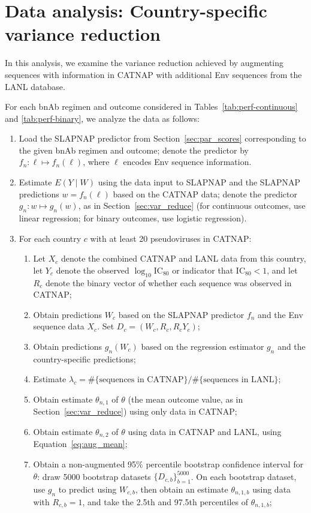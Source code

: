 \documentclass[10pt]{article}
\begin{document}
\section{Data analysis: Country-specific variance reduction}

In this analysis, we examine the variance reduction achieved by augmenting sequences with information in CATNAP with additional Env sequences from the LANL database.

For each bnAb regimen and outcome considered in Tables~\ref{tab:perf-continuous} and \ref{tab:perf-binary}, we analyze the data as follows:
\begin{enumerate}
  \item Load the SLAPNAP predictor from Section~\ref{sec:par_scores} corresponding to the given bnAb regimen and outcome; denote the predictor by $f_n: \ell \mapsto f_n(\ell)$, where $\ell$ encodes Env sequence information.
  \item Estimate $E(Y \mid W)$ using the data input to SLAPNAP and the SLAPNAP predictions $w = f_n(\ell)$ based on the CATNAP data; denote the predictor $g_n: w \mapsto g_n(w)$, as in Section~\ref{sec:var_reduce} (for continuous outcomes, use linear regression; for binary outcomes, use logistic regression).
  \item For each country $c$ with at least 20 pseudoviruses in CATNAP:
  \begin{enumerate}
    \item Let $X_c$ denote the combined CATNAP and LANL data from this country, let $Y_c$ denote the observed $\log_{10} \text{IC}_{80}$ or indicator that IC$_{80} < 1$, and let $R_c$ denote the binary vector of whether each sequence was observed in CATNAP;
    \item Obtain predictions $W_c$ based on the SLAPNAP predictor $f_n$ and the Env sequence data $X_c$. Set $D_c = (W_c, R_c, R_cY_c)$;
    \item Obtain predictions $g_n(W_c)$ based on the regression estimator $g_n$ and the country-specific predictions;
    \item Estimate $\lambda_c = \#\{\text{sequences in CATNAP}\} / \#\{\text{sequences in LANL}\}$;
    \item Obtain estimate $\theta_{n,1}$ of $\theta$ (the mean outcome value, as in Section~\ref{sec:var_reduce}) using only data in CATNAP;
    \item Obtain estimate $\theta_{n,2}$ of $\theta$ using data in CATNAP and LANL, using Equation~\eqref{eq:aug_mean};
    \item Obtain a non-augmented 95\% percentile bootstrap confidence interval for $\theta$: draw 5000 bootstrap datasets $\{D_{c,b}\}_{b = 1}^{5000}$. On each bootstrap dataset, use $g_n$ to predict using $W_{c,b}$, then obtain an estimate $\theta_{n,1,b}$ using data with $R_{c,b} = 1$, and take the 2.5th and 97.5th percentiles of $\theta_{n,1,b}$;

\end{enumerate}
\end{enumerate}
\end{document}
